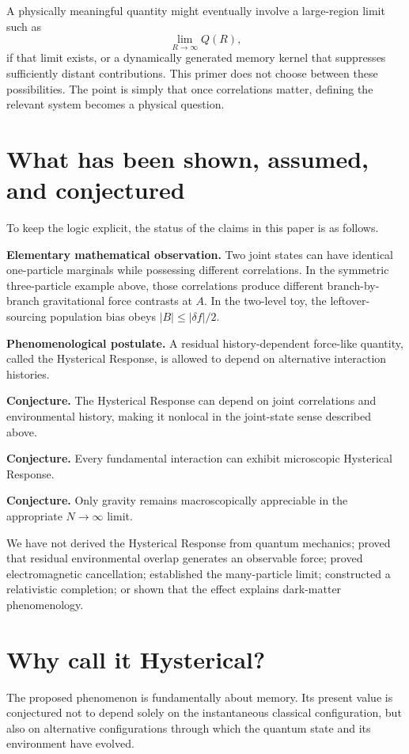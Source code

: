 \documentclass[11pt]{article}
\begin{document}
A physically meaningful quantity might eventually involve a large-region limit such as
\begin{equation}
\lim_{R\to\infty}Q(R),
\end{equation}
if that limit exists, or a dynamically generated memory kernel that suppresses sufficiently distant contributions. This primer does not choose between these possibilities. The point is simply that once correlations matter, defining the relevant system becomes a physical question.

\section{What has been shown, assumed, and conjectured}
To keep the logic explicit, the status of the claims in this paper is as follows.

\textbf{Elementary mathematical observation.} Two joint states can have identical one-particle marginals while possessing different correlations. In the symmetric three-particle example above, those correlations produce different branch-by-branch gravitational force contrasts at $A$. In the two-level toy, the leftover-sourcing population bias obeys $|B|\le|\delta f|/2$.

\textbf{Phenomenological postulate.} A residual history-dependent force-like quantity, called the Hysterical Response, is allowed to depend on alternative interaction histories.

\textbf{Conjecture.} The Hysterical Response can depend on joint correlations and environmental history, making it nonlocal in the joint-state sense described above.

\textbf{Conjecture.} Every fundamental interaction can exhibit microscopic Hysterical Response.

\textbf{Conjecture.} Only gravity remains macroscopically appreciable in the appropriate $N\to\infty$ limit.

We have not derived the Hysterical Response from quantum mechanics; proved that residual environmental overlap generates an observable force; proved electromagnetic cancellation; established the many-particle limit; constructed a relativistic completion; or shown that the effect explains dark-matter phenomenology.

\section{Why call it Hysterical?}
The proposed phenomenon is fundamentally about memory. Its present value is conjectured not to depend solely on the instantaneous classical configuration, but also on alternative configurations through which the quantum state and its environment have evolved.
\end{document}
